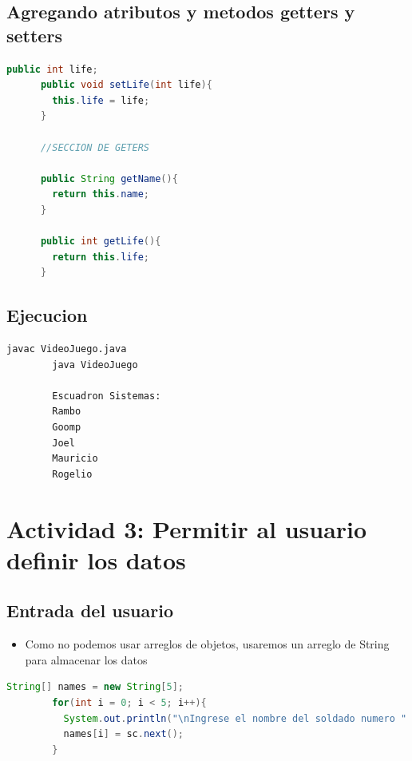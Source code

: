 \documentclass{article}
\begin{document}
        \subsection{Agregando atributos y metodos getters y setters}
        \begin{lstlisting}[language=java, caption={Creando un nuevo atributo para Soldado}]
      public int life;
      public void setLife(int life){
        this.life = life;
      }
    
      //SECCION DE GETERS
    
      public String getName(){
        return this.name;
      }
    
      public int getLife(){
        return this.life;
      }
        \end{lstlisting}
    \subsection{Ejecucion}
    \begin{lstlisting}[language=bash, caption={Ejecucion del codigo}]
        javac VideoJuego.java
        java VideoJuego
        
        Escuadron Sistemas:
        Rambo
        Goomp
        Joel
        Mauricio
        Rogelio

    \end{lstlisting}
    \section{Actividad 3: Permitir al usuario definir los datos}
        \subsection{Entrada del usuario}
        \begin{itemize}
            \item Como no podemos usar arreglos de objetos, usaremos un arreglo de String para almacenar los datos
        \end{itemize}
        \begin{lstlisting}[language=java, caption={Almacenando los nombres usando un ciclo for}]
        String[] names = new String[5];
        for(int i = 0; i < 5; i++){
          System.out.println("\nIngrese el nombre del soldado numero " + (i + 1) + ":");
          names[i] = sc.next();
        }
    
        \end{lstlisting}
\end{document}
